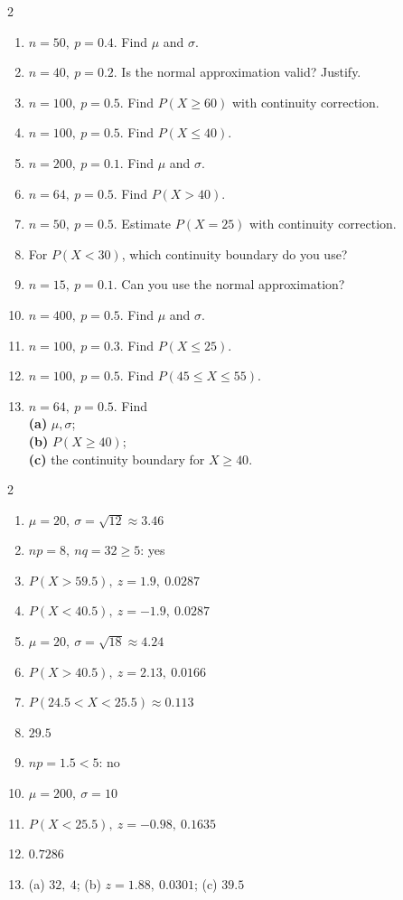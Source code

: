 \documentclass[11pt]{article}
\begin{document}
\clearpage
{}

\begin{recapbox}
\begin{multicols}{2}
\small
\begin{enumerate}[leftmargin=*,itemsep=3pt]
  \item $n=50,\ p=0.4$. Find $\mu$ and $\sigma$.
  \item $n=40,\ p=0.2$. Is the normal approximation valid? Justify.
  \item $n=100,\ p=0.5$. Find $P(X\ge60)$ with continuity correction.
  \item $n=100,\ p=0.5$. Find $P(X\le40)$.
  \item $n=200,\ p=0.1$. Find $\mu$ and $\sigma$.
  \item $n=64,\ p=0.5$. Find $P(X>40)$.
  \item $n=50,\ p=0.5$. Estimate $P(X=25)$ with continuity correction.
  \item For $P(X<30)$, which continuity boundary do you use?
  \item $n=15,\ p=0.1$. Can you use the normal approximation?
  \item $n=400,\ p=0.5$. Find $\mu$ and $\sigma$.
  \item $n=100,\ p=0.3$. Find $P(X\le25)$.
  \item $n=100,\ p=0.5$. Find $P(45\le X\le55)$.
  \item $n=64,\ p=0.5$. Find \\ \textbf{(a)} $\mu,\sigma$; \\ \textbf{(b)} $P(X\ge40)$; \\ \textbf{(c)} the continuity boundary for $X\ge40$.
\end{enumerate}
\end{multicols}
\end{recapbox}

\begin{keybox}
\begin{multicols}{2}
\small
\begin{enumerate}[leftmargin=*,itemsep=3pt]
  \item $\mu=20,\ \sigma=\sqrt{12}\approx3.46$
  \item $np=8,\ nq=32\ge5$: yes
  \item $P(X>59.5),\ z=1.9,\ 0.0287$
  \item $P(X<40.5),\ z=-1.9,\ 0.0287$
  \item $\mu=20,\ \sigma=\sqrt{18}\approx4.24$
  \item $P(X>40.5),\ z=2.13,\ 0.0166$
  \item $P(24.5<X<25.5)\approx0.113$
  \item $29.5$
  \item $np=1.5<5$: no
  \item $\mu=200,\ \sigma=10$
  \item $P(X<25.5),\ z=-0.98,\ 0.1635$
  \item $0.7286$
  \item (a) $32,\ 4$; (b) $z=1.88,\ 0.0301$; (c) $39.5$
\end{enumerate}
\end{multicols}
\end{keybox}
\end{document}
